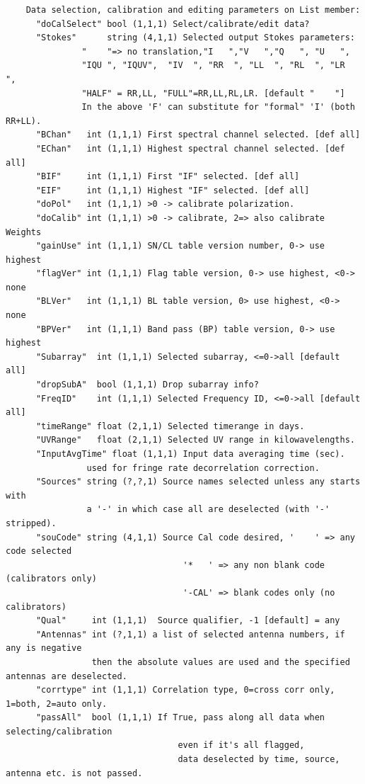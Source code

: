 \documentclass[11pt]{report}
\begin{document}
\begin{verbatim}
    Data selection, calibration and editing parameters on List member:
      "doCalSelect" bool (1,1,1) Select/calibrate/edit data?
      "Stokes"      string (4,1,1) Selected output Stokes parameters:
               "    "=> no translation,"I   ","V   ","Q   ", "U   ", 
               "IQU ", "IQUV",  "IV  ", "RR  ", "LL  ", "RL  ", "LR  ", 
               "HALF" = RR,LL, "FULL"=RR,LL,RL,LR. [default "    "]
               In the above 'F' can substitute for "formal" 'I' (both RR+LL).
      "BChan"   int (1,1,1) First spectral channel selected. [def all]
      "EChan"   int (1,1,1) Highest spectral channel selected. [def all]
      "BIF"     int (1,1,1) First "IF" selected. [def all]
      "EIF"     int (1,1,1) Highest "IF" selected. [def all]
      "doPol"   int (1,1,1) >0 -> calibrate polarization.
      "doCalib" int (1,1,1) >0 -> calibrate, 2=> also calibrate Weights
      "gainUse" int (1,1,1) SN/CL table version number, 0-> use highest
      "flagVer" int (1,1,1) Flag table version, 0-> use highest, <0-> none
      "BLVer"   int (1,1,1) BL table version, 0> use highest, <0-> none
      "BPVer"   int (1,1,1) Band pass (BP) table version, 0-> use highest
      "Subarray"  int (1,1,1) Selected subarray, <=0->all [default all]
      "dropSubA"  bool (1,1,1) Drop subarray info?
      "FreqID"    int (1,1,1) Selected Frequency ID, <=0->all [default all]
      "timeRange" float (2,1,1) Selected timerange in days.
      "UVRange"   float (2,1,1) Selected UV range in kilowavelengths.
      "InputAvgTime" float (1,1,1) Input data averaging time (sec).
                used for fringe rate decorrelation correction.
      "Sources" string (?,?,1) Source names selected unless any starts with
                a '-' in which case all are deselected (with '-' stripped).
      "souCode" string (4,1,1) Source Cal code desired, '    ' => any code selected
                                   '*   ' => any non blank code (calibrators only)
                                   '-CAL' => blank codes only (no calibrators)
      "Qual"     int (1,1,1)  Source qualifier, -1 [default] = any
      "Antennas" int (?,1,1) a list of selected antenna numbers, if any is negative
                 then the absolute values are used and the specified antennas are deselected.
      "corrtype" int (1,1,1) Correlation type, 0=cross corr only, 1=both, 2=auto only.
      "passAll"  bool (1,1,1) If True, pass along all data when selecting/calibration
                                  even if it's all flagged, 
                                  data deselected by time, source, antenna etc. is not passed.

\end{verbatim}
\end{document}
